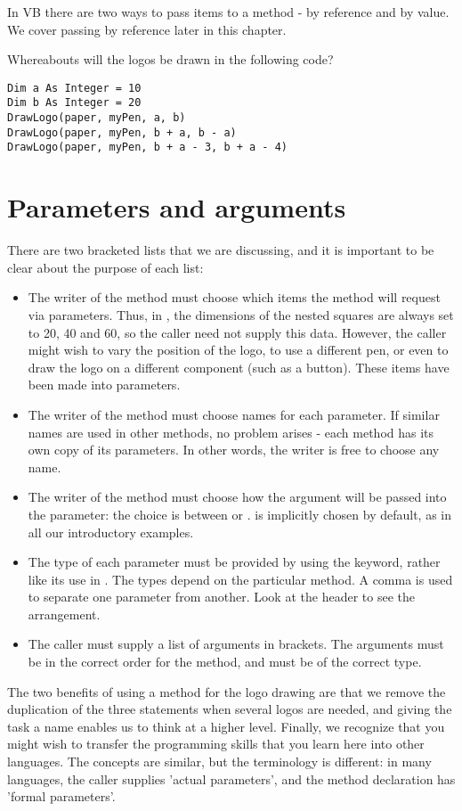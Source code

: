 		In VB there are two ways to pass items to a method - by reference and by value. We cover passing by reference later in this chapter.

		\begin{stqb}
			\begin{STQ}
				\item	Whereabouts will the logos be drawn in the following code?
					\begin{lstlisting}
Dim a As Integer = 10
Dim b As Integer = 20
DrawLogo(paper, myPen, a, b)
DrawLogo(paper, myPen, b + a, b - a)
DrawLogo(paper, myPen, b + a - 3, b + a - 4)
					\end{lstlisting}
			\end{STQ}
		\end{stqb}

	\section{Parameters and arguments}
		There are two bracketed lists that we are discussing, and it is important to be clear about the purpose of each list:
		\begin{itemize}
			\item The writer of the method must choose which items the method will request via parameters. Thus, in , the dimensions of the nested squares are always set to 20, 40 and 60, so the caller need not supply this data. However, the caller might wish to vary the position of the logo, to use a different pen, or even to draw the logo on a different component (such as a button). These items have been made into parameters.
			\item The writer of the method must choose names for each parameter. If similar names are used in other methods, no problem arises - each method has its own copy of its parameters. In other words, the writer is free to choose any name.
			\item The writer of the method must choose how the argument will be passed into the parameter: the choice is between  or .  is implicitly chosen by default, as in all our introductory examples.
			\item The type of each parameter must be provided by using the  keyword, rather like its use in . The types depend on the particular method. A comma is used to separate one parameter from another. Look at the  header to see the arrangement.
			\item The caller must supply a list of arguments in brackets. The arguments must be in the correct order for the method, and must be of the correct type.
		\end{itemize}
The two benefits of using a method for the logo drawing are that we remove the
duplication of the three  statements when several logos are needed, and giving the task a name enables us to think at a higher level.
Finally, we recognize that you might wish to transfer the programming skills that you learn here into other languages. The concepts are similar, but the terminology is different: in many languages, the caller supplies 'actual parameters', and the method declaration has 'formal parameters'.

